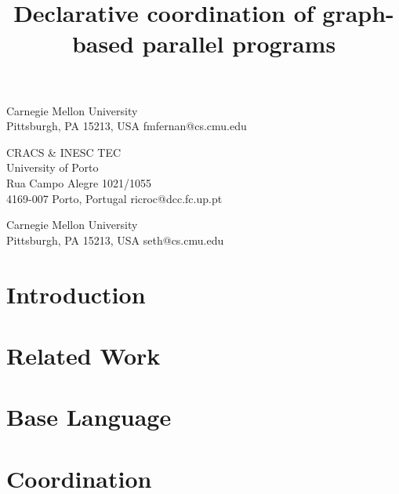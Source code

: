 \documentclass[pldi,blind]{sigplanconf-pldi15}
\begin{document}
%
%

\title{Declarative coordination of graph-based parallel programs}
           {Carnegie Mellon University\\Pittsburgh, PA 15213, USA}
           {fmfernan@cs.cmu.edu}

           {CRACS \& INESC TEC\\University of Porto\\Rua Campo Alegre 1021/1055\\4169-007 Porto, Portugal}
           {ricroc@dcc.fc.up.pt}

           {Carnegie Mellon University\\Pittsburgh, PA 15213, USA}
           {seth@cs.cmu.edu}

\newcommand{\scare}[1]{``#1''} 

\maketitle
\begin{abstract}

\end{abstract}

\iffalse
\category{D.1.3}{PROGRAMMING TECHNIQUES}{Concurrent Programming}[Parallel Programming]
\category{D.3.4}{PROCESSORS}{Run-time environments}

\terms{Design, Languages, Performance}

\keywords{Parallel Programming, Linear Logic}
\fi

\section{Introduction}


\section{Related Work}


\section{Base Language}\label{sec:language}


\section{Coordination}\label{sec:coordination}

\end{document}
